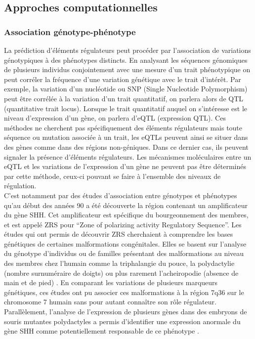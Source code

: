 \subsection{Approches computationnelles}
\label{subsec:approch-comput}

\subsubsection{Association génotype-phénotype}
\label{subsubsec:geno-pheno}

La prédiction d’éléments régulateurs peut procéder par l’association de variations génotypiques à des phénotypes distincts. En analysant les séquences génomiques de plusieurs individus conjointement avec une mesure d’un trait phénotypique on peut corréler la fréquence d’une variation génétique avec le trait d'intérêt. Par exemple, la variation d’un nucléotide ou SNP (Single Nucleotide Polymorphism) peut être corrélée à la variation d’un trait quantitatif, on parlera alors de QTL (quantitative trait locus). Lorsque le trait quantitatif auquel on s’intéresse est le niveau d’expression d’un gène, on parlera d’eQTL (expression QTL). Ces méthodes ne cherchent pas spécifiquement des éléments régulateurs mais toute séquence ou mutation associée à un trait, les eQTLs peuvent ainsi se situer dans des gènes comme dans des régions non-géniques. Dans ce dernier cas, ils peuvent signaler la présence d'éléments régulateurs. Les mécanismes moléculaires entre un eQTL et les variations de l’expression d’un gène ne peuvent pas être déterminés par cette méthode, ceux-ci pouvant se faire à l’ensemble des niveaux de régulation. \\

C’est notamment par des études d’association entre génotypes et phénotypes qu’au début des années 90 a été découverte la région contenant un \gls{amplificateur} du gène \acrshort{SHH}. Cet \gls{amplificateur} est spécifique du bourgeonnement des membres, et est appelé \acrshort{ZRS} pour “Zone of polarizing activity Regulatory Sequence”. Les études qui ont permis de découvrir \acrshort{ZRS} cherchaient à comprendre les bases génétiques de certaines malformations congénitales. Elles se basent sur l’analyse du génotype d’individus ou de familles présentant des malformations au niveau des membres chez l’humain comme la triphalangie du pouce, la polydactylie (nombre surnuméraire de doigts) ou plus rarement l’acheiropodie (absence de main et de pied) \citep{hing_linkage_1995, zguricas_clinical_1999}. En comparant les variations de plusieurs marqueurs génétiques, ces études ont pu associer ces malformations à la région 7q36 sur le chromosome 7 humain sans pour autant connaître son rôle régulateur. Parallèlement, l’analyse de l’expression de plusieurs gènes dans des embryons de souris mutantes polydactyles a permis d’identifier une expression anormale du gène \acrshort{SHH} comme potentiellement responsable de ce phénotype \citep{sharpe_identification_1999}. \\

